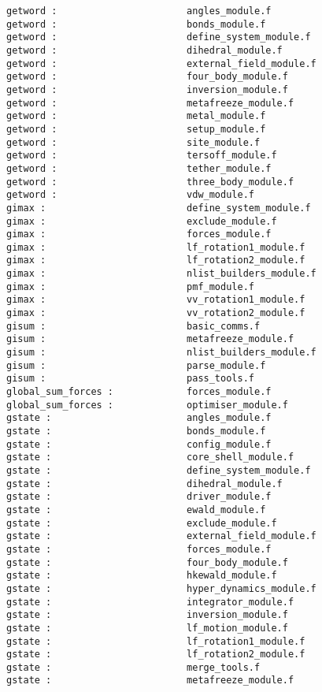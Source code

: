\begin{verbatim}
getword :                       angles_module.f
getword :                       bonds_module.f
getword :                       define_system_module.f
getword :                       dihedral_module.f
getword :                       external_field_module.f
getword :                       four_body_module.f
getword :                       inversion_module.f
getword :                       metafreeze_module.f
getword :                       metal_module.f
getword :                       setup_module.f
getword :                       site_module.f
getword :                       tersoff_module.f
getword :                       tether_module.f
getword :                       three_body_module.f
getword :                       vdw_module.f
gimax :                         define_system_module.f
gimax :                         exclude_module.f
gimax :                         forces_module.f
gimax :                         lf_rotation1_module.f
gimax :                         lf_rotation2_module.f
gimax :                         nlist_builders_module.f
gimax :                         pmf_module.f
gimax :                         vv_rotation1_module.f
gimax :                         vv_rotation2_module.f
gisum :                         basic_comms.f
gisum :                         metafreeze_module.f
gisum :                         nlist_builders_module.f
gisum :                         parse_module.f
gisum :                         pass_tools.f
global_sum_forces :             forces_module.f
global_sum_forces :             optimiser_module.f
gstate :                        angles_module.f
gstate :                        bonds_module.f
gstate :                        config_module.f
gstate :                        core_shell_module.f
gstate :                        define_system_module.f
gstate :                        dihedral_module.f
gstate :                        driver_module.f
gstate :                        ewald_module.f
gstate :                        exclude_module.f
gstate :                        external_field_module.f
gstate :                        forces_module.f
gstate :                        four_body_module.f
gstate :                        hkewald_module.f
gstate :                        hyper_dynamics_module.f
gstate :                        integrator_module.f
gstate :                        inversion_module.f
gstate :                        lf_motion_module.f
gstate :                        lf_rotation1_module.f
gstate :                        lf_rotation2_module.f
gstate :                        merge_tools.f
gstate :                        metafreeze_module.f

\end{verbatim}
